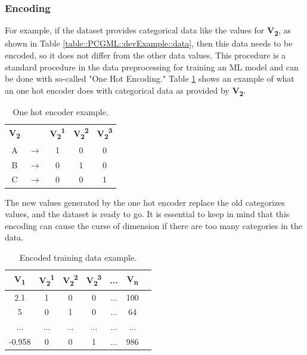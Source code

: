 \documentclass[MGS,Master,english]{twbook}%
\begin{document}
\subsubsection{Encoding}
For example, if the dataset provides categorical data like the values for \textbf{V\textsubscript{2}}, as shown in Table \ref{table::PCGML::devExample::data}, then this data needs to be encoded, so it does not differ from the other data values. This procedure is a standard procedure in the data preprocessing for training an \ac{ML} model and can be done with so-called "One Hot Encoding." Table \ref{table::PCGML::devExample::oneHotEncoder} shows an example of what an one hot encoder does with categorical data as provided by \textbf{V\textsubscript{2}}. 
\begin{table}[!ht]
	\centering
	\begin{tabular}{|c|c|c|c|c|}
		\cline{1-1} \cline{3-5}
		\textbf{V\textsubscript{2}} &  & \textbf{V\textsubscript{2}\textsuperscript{1}} & \textbf{V\textsubscript{2}\textsuperscript{2}} & \textbf{V\textsubscript{2}\textsuperscript{3}} \\ \hhline{=~===}
		A           & $\longrightarrow$         & 1           & 0           & 0           \\ \cline{1-1} \cline{3-5} 
		B           & $\longrightarrow$         & 0           & 1           & 0           \\ \cline{1-1} \cline{3-5} 
		C           & $\longrightarrow$         & 0           & 0           & 1           \\ \cline{1-1} \cline{3-5} 
	\end{tabular}
	\caption{One hot encoder example.}
	\label{table::PCGML::devExample::oneHotEncoder}
\end{table}
The new values generated by the one hot encoder replace the old categorizes values, and the dataset is ready to go. It is essential to keep in mind that this encoding can cause the curse of dimension if there are too many categories in the data.
\begin{table}[!ht]
	\centering
	\begin{tabular}{|c|c|c|c|c|c|c|}
		\hline
		\textbf{V\textsubscript{1}} & \textbf{V\textsubscript{2}\textsuperscript{1}}& \textbf{V\textsubscript{2}\textsuperscript{2}}& \textbf{V\textsubscript{2}\textsuperscript{3}} & \textbf{...} & \textbf{V\textsubscript{n}} \\ \hline\hline
		2.1         & 1   & 0   & 0       & ...          & 100         \\ \hline
		5           & 0   & 1   & 0       & ...          & 64          \\ \hline
		...         & ... & ... & ...     & ...          & ...         \\ \hline
		-0.958      & 0   & 0   & 1       & ...          & 986         \\ \hline
	\end{tabular}
	\caption{Encoded training data example.}
	\label{table::PCGML::devExample::data_encoded}
\end{table}
\end{document}
